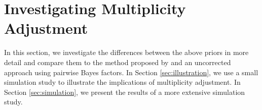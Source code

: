 \documentclass[11pt,a4paper]{article}
\theoremstyle{definition} %
\theoremstyle{case}
\begin{document}
\section{Investigating Multiplicity Adjustment} \label{sec:simulation-study}
In this section, we investigate the differences between the above priors in more detail and compare them to the method proposed by \textcite{westfall1997bayesian} and an uncorrected approach using pairwise Bayes factors. In Section \ref{sec:illustration}, we use a small simulation study to illustrate the implications of multiplicity adjustment. In Section \ref{sec:simulation}, we present the results of a more extensive simulation study.

\end{document}
